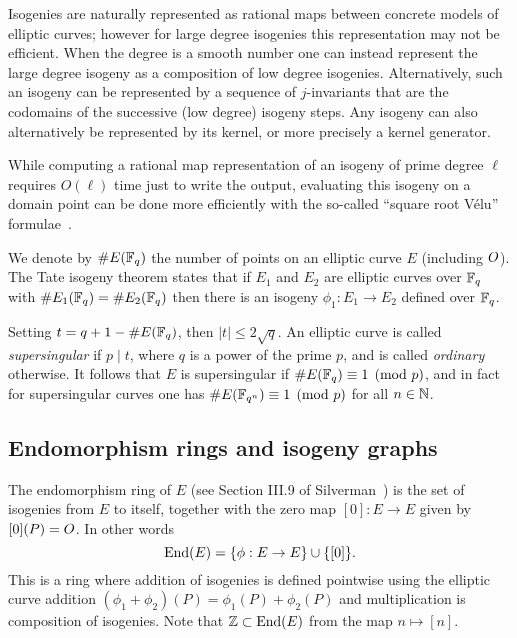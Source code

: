 Isogenies are naturally represented as rational maps between concrete models of elliptic curves; however for large degree isogenies this representation may not be efficient. When the degree is a smooth number one can instead represent the large degree isogeny as a composition of low degree isogenies.
Alternatively, such an isogeny can be represented by a sequence of $j$-invariants that are the codomains of the successive (low degree) isogeny steps. 
%
Any isogeny can also alternatively be represented by its kernel, or more precisely a kernel generator. 
%

While computing a rational map representation of an isogeny of prime degree $\ell$ requires $O(\ell)$ time just to write the output, evaluating this isogeny on a domain point  can be done more efficiently with the so-called ``square root Vélu'' formulae~\cite{velusqrt}. %



We denote by $\# E( \mathbb{F}_q )$ the number of points on an elliptic curve $E$ (including $O$).
The Tate isogeny theorem  states that if $E_1$ and $E_2$ are elliptic curves over $\mathbb{F}_q$ with $\#E_1(\mathbb{F}_q) = \#E_2(\mathbb{F}_q)$ then there is an isogeny $\phi_1 : E_1 \rightarrow E_2$ defined over $\mathbb{F}_q$.


Setting $t = q + 1 - \#E(\mathbb{F}_q )$, then $|t| \le 2 \sqrt{q}$.
An elliptic curve is called \emph{supersingular} if $p \mid t$, where $q$ is a power of the prime $p$, and is called \emph{ordinary} otherwise.
It follows that $E$ is supersingular if $\#E(\mathbb{F}_q ) \equiv 1 \pmod{p} $, and in fact for supersingular curves one has $\#E( \mathbb{F}_{q^n}) \equiv 1 \pmod{p}$ for all $n \in \mathbb{N}$.


\subsection{Endomorphism rings and isogeny graphs}
\label{sec:isog-graph}



The endomorphism ring of $E$ (see Section III.9 of Silverman~\cite{Silverman}) is the set of isogenies  from $E$ to itself, together with the zero map $[0] : E \to E$ given by $[0](P) = O$.
In other words
\[
   \text{End}(E)  = \{ \phi : E \to E \} \cup \{ [0] \}.
\]
This is a ring where addition of isogenies is defined pointwise using the elliptic curve addition $(\phi_1 + \phi_2)(P) = \phi_1(P) + \phi_2(P)$ and multiplication is composition of isogenies.
Note that $\mathbb{Z} \subset \text{End}(E)$ from the map $n \mapsto [n]$.

